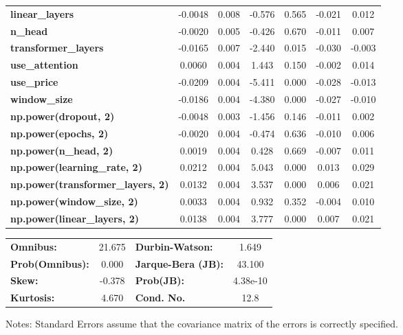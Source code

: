 \begin{center}
\begin{tabular}{lcccccc}
\textbf{linear\_layers}                   &      -0.0048  &        0.008     &    -0.576  &         0.565        &       -0.021    &        0.012     \\
\textbf{n\_head}                          &      -0.0020  &        0.005     &    -0.426  &         0.670        &       -0.011    &        0.007     \\
\textbf{transformer\_layers}              &      -0.0165  &        0.007     &    -2.440  &         0.015        &       -0.030    &       -0.003     \\
\textbf{use\_attention}                   &       0.0060  &        0.004     &     1.443  &         0.150        &       -0.002    &        0.014     \\
\textbf{use\_price}                       &      -0.0209  &        0.004     &    -5.411  &         0.000        &       -0.028    &       -0.013     \\
\textbf{window\_size}                     &      -0.0186  &        0.004     &    -4.380  &         0.000        &       -0.027    &       -0.010     \\
\textbf{np.power(dropout, 2)}             &      -0.0048  &        0.003     &    -1.456  &         0.146        &       -0.011    &        0.002     \\
\textbf{np.power(epochs, 2)}              &      -0.0020  &        0.004     &    -0.474  &         0.636        &       -0.010    &        0.006     \\
\textbf{np.power(n\_head, 2)}             &       0.0019  &        0.004     &     0.428  &         0.669        &       -0.007    &        0.011     \\
\textbf{np.power(learning\_rate, 2)}      &       0.0212  &        0.004     &     5.043  &         0.000        &        0.013    &        0.029     \\
\textbf{np.power(transformer\_layers, 2)} &       0.0132  &        0.004     &     3.537  &         0.000        &        0.006    &        0.021     \\
\textbf{np.power(window\_size, 2)}        &       0.0033  &        0.004     &     0.932  &         0.352        &       -0.004    &        0.010     \\
\textbf{np.power(linear\_layers, 2)}      &       0.0138  &        0.004     &     3.777  &         0.000        &        0.007    &        0.021     \\
\bottomrule
\end{tabular}
\begin{tabular}{lclc}
\textbf{Omnibus:}       & 21.675 & \textbf{  Durbin-Watson:     } &    1.649  \\
\textbf{Prob(Omnibus):} &  0.000 & \textbf{  Jarque-Bera (JB):  } &   43.100  \\
\textbf{Skew:}          & -0.378 & \textbf{  Prob(JB):          } & 4.38e-10  \\
\textbf{Kurtosis:}      &  4.670 & \textbf{  Cond. No.          } &     12.8  \\
\bottomrule
\end{tabular}
\end{center}

Notes: \newline
 [1] Standard Errors assume that the covariance matrix of the errors is correctly specified.